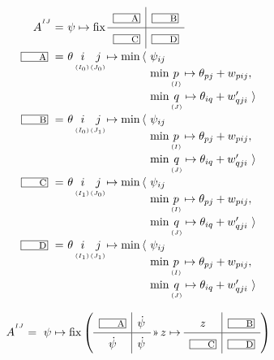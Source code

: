 \begin{equation}
  \renewcommand\arraystretch{1.2}
  \begin{array}{@{}r@{}l@{}c@{}c@{}l@{}l@{}}
    A^{^{IJ}} =~ & \lspan5{\psi\mapsto \fix \quadrants{\lbox A}{\lbox B}{\lbox C}{\lbox D}} \\
	\lbox A ~=~ & \theta\,& i & j & \mapsto\min\,\langle~ & \psi_{ij} \\
	      & & ^{^{(I_0)}} & ^{^{(J_0)}} & & \min \vtyped p I \mapsto\theta_{pj}+w_{pij}, \\
	      & & & & & \min \vtyped q J \mapsto\theta_{iq}+w'_{qji} ~\rangle \\
	\lbox B ~=~ & \theta\,& i & j & \mapsto\min\,\langle~ & \psi_{ij} \\
	      & & ^{^{(I_0)}} & ^{^{(J_1)}} & & \min \vtyped p I \mapsto\theta_{pj}+w_{pij}, \\
	      & & & & & \min \vtyped q J \mapsto\theta_{iq}+w'_{qji} ~\rangle \\
	\lbox C ~=~ & \theta\,& i & j & \mapsto\min\,\langle~ & \psi_{ij} \\
	      & & ^{^{(I_1)}} & ^{^{(J_0)}} & & \min \vtyped p I \mapsto\theta_{pj}+w_{pij}, \\
	      & & & & & \min \vtyped q J \mapsto\theta_{iq}+w'_{qji} ~\rangle \\
	\lbox D ~=~ & \theta\,& i & j & \mapsto\min\,\langle~ & \psi_{ij} \\
	      & & ^{^{(I_1)}} & ^{^{(J_1)}} & & \min \vtyped p I \mapsto\theta_{pj}+w_{pij}, \\
	      & & & & & \min \vtyped q J \mapsto\theta_{iq}+w'_{qji} ~\rangle \\
  \end{array}
\end{equation}

\begin{center}
\end{center}

\begin{equation}
  A^{^{IJ}} =~ \psi\mapsto \fix \left(\quadrants{\lbox A}{\dot\psi}{\dot\psi}{\dot\psi} \applt z\mapsto\quadrants{z}{\lbox B}{\lbox C}{\lbox D}\right)
\end{equation}

